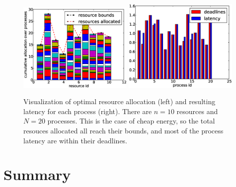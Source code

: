 \begin{figure}[th]
\centering
\includegraphics[width=0.49\textwidth]{figures/test_resource_c.eps}
\includegraphics[width=0.49\textwidth]{figures/test_latency_c.eps}
\caption{Visualization of optimal resource allocation (left) and 
    resulting latency for each process (right).
    There are $n=10$ resources and $N=20$ processes.
    This is the case of cheap energy, so the total resouces allocated
    all reach their bounds, and most of the process latency are 
within their deadlines.}
\label{fig:allocation-c}
\end{figure}

\section{Summary}

